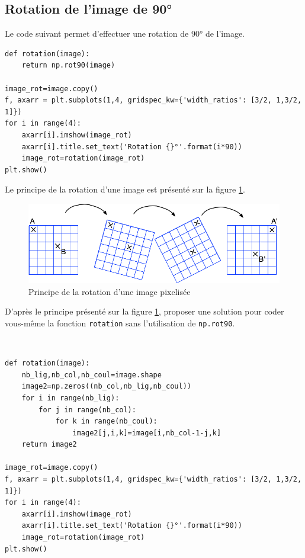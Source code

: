 \subsection{Rotation de l'image de 90°}

Le code suivant permet d'effectuer une rotation de 90° de l'image.

\begin{verbatim}
def rotation(image):
    return np.rot90(image)

image_rot=image.copy()
f, axarr = plt.subplots(1,4, gridspec_kw={'width_ratios': [3/2, 1,3/2, 1]})
for i in range(4):
    axarr[i].imshow(image_rot)
    axarr[i].title.set_text('Rotation {}°'.format(i*90))
    image_rot=rotation(image_rot)
plt.show()
\end{verbatim} 

Le principe de la rotation d'une image est présenté sur la figure \ref{img2}.
\begin{figure}[ht!]
	\begin{center}
		\includegraphics[width=0.7\linewidth]{rotation.png}
	\end{center}
	\caption{Principe de la rotation d'une image pixelisée}
	\label{img2}
\end{figure}

\begin{exercice}
D'après le principe présenté sur la figure \ref{img2}, proposer une solution pour coder vous-même la fonction \verb?rotation? sans l'utilisation de \verb?np.rot90?.
\end{exercice}

\begin{solution}~\\
\vspace{-0.7cm}
\begin{verbatim}
def rotation(image):
    nb_lig,nb_col,nb_coul=image.shape
    image2=np.zeros((nb_col,nb_lig,nb_coul))
    for i in range(nb_lig):
        for j in range(nb_col):
            for k in range(nb_coul):
                image2[j,i,k]=image[i,nb_col-1-j,k]
    return image2

image_rot=image.copy()
f, axarr = plt.subplots(1,4, gridspec_kw={'width_ratios': [3/2, 1,3/2, 1]})
for i in range(4):
    axarr[i].imshow(image_rot)
    axarr[i].title.set_text('Rotation {}°'.format(i*90))
    image_rot=rotation(image_rot)
plt.show()
\end{verbatim} 
\end{solution}

